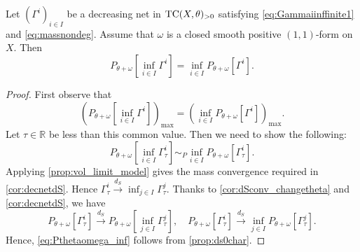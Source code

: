 \begin{lemma}\label{lma:testcurinfcompatible}
    Let $(\Gamma^i)_{i\in I}$ be a decreasing net in $\mathrm{TC}(X,\theta)_{>0}$ satisfying \eqref{eq:Gammaiinffinite1} and \eqref{eq:massnondeg}. Assume that $\omega$ is a closed smooth positive $(1,1)$-form on $X$. Then
    \[
    P_{\theta+\omega}\left[ \inf_{i\in I} \Gamma^{i} \right]= \inf_{i\in I} P_{\theta+\omega}\left[ \Gamma^{i} \right].
    \]
\end{lemma}
\begin{proof}
    First observe that
    \[
     \left( P_{\theta+\omega}\left[ \inf_{i\in I} \Gamma^{i} \right] \right)_{\max}= \left(\inf_{i\in I} P_{\theta+\omega}\left[ \Gamma^{i} \right]\right)_{\max}.
    \]
    Let $\tau\in \mathbb{R}$ be less than this common value. Then we need to show the following:
    \begin{equation}\label{eq:Pthetaomega_inf}
    P_{\theta+\omega}\left[ \inf_{i\in I} \Gamma^i_{\tau} \right]\sim_P \inf_{i\in I} P_{\theta+\omega}\left[  \Gamma^i_{\tau} \right].
    \end{equation}
    Applying \cref{prop:vol_limit_model} gives the mass convergence required in \cref{cor:decnetdS}. Hence $\Gamma^i_{\tau}\xrightarrow{d_S}\inf_{j\in I} \Gamma^j_{\tau} $. Thanks to \cref{cor:dSconv_changetheta} and \cref{cor:decnetdS}, we have
    \[
    P_{\theta+\omega}\left[ \Gamma^i_{\tau} \right]\xrightarrow{d_S} P_{\theta+\omega}\left[ \inf_{j\in I} \Gamma^j_{\tau} \right],\quad P_{\theta+\omega}\left[ \Gamma^i_{\tau} \right]\xrightarrow{d_S}  \inf_{j\in I} P_{\theta+\omega}\left[  \Gamma^j_{\tau} \right].
    \]
    Hence, \eqref{eq:Pthetaomega_inf} follows from \cref{prop:ds0char}.
\end{proof}



%

